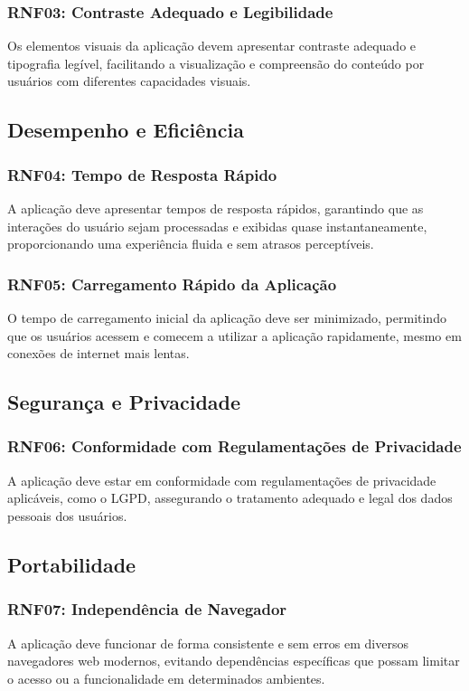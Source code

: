 \subsubsection{\gls{RNF}03: Contraste Adequado e Legibilidade}
Os elementos visuais da aplicação devem apresentar contraste adequado e tipografia legível, facilitando a visualização e compreensão do conteúdo por usuários com diferentes capacidades visuais.

\subsection{Desempenho e Eficiência}

\subsubsection{\gls{RNF}04: Tempo de Resposta Rápido}
A aplicação deve apresentar tempos de resposta rápidos, garantindo que as interações do usuário sejam processadas e exibidas quase instantaneamente, proporcionando uma experiência fluida e sem atrasos perceptíveis.

\subsubsection{\gls{RNF}05: Carregamento Rápido da Aplicação}
O tempo de carregamento inicial da aplicação deve ser minimizado, permitindo que os usuários acessem e comecem a utilizar a aplicação rapidamente, mesmo em conexões de internet mais lentas.

\subsection{Segurança e Privacidade}

\subsubsection{\gls{RNF}06: Conformidade com Regulamentações de Privacidade}
A aplicação deve estar em conformidade com regulamentações de privacidade aplicáveis, como o \gls{LGPD}, assegurando o tratamento adequado e legal dos dados pessoais dos usuários.

\subsection{Portabilidade}
\subsubsection{\gls{RNF}07: Independência de Navegador}
A aplicação deve funcionar de forma consistente e sem erros em diversos navegadores web modernos, evitando dependências específicas que possam limitar o acesso ou a funcionalidade em determinados ambientes.


